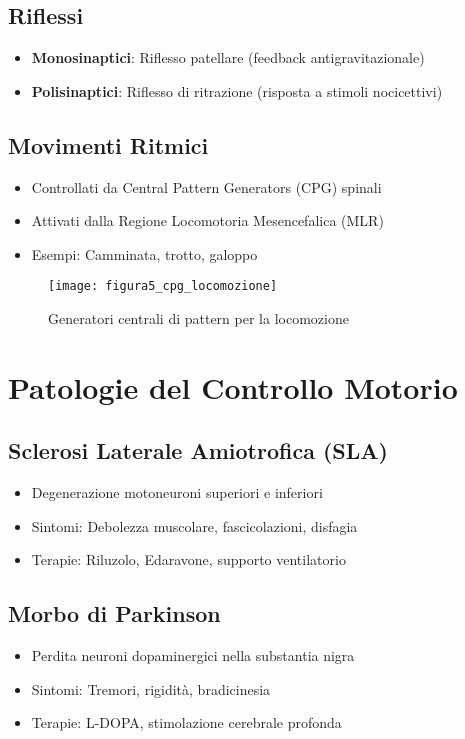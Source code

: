 \documentclass{article}
\begin{document}
\subsection{Riflessi}
\begin{itemize}
    \item \textbf{Monosinaptici}: Riflesso patellare (feedback antigravitazionale)
    \item \textbf{Polisinaptici}: Riflesso di ritrazione (risposta a stimoli nocicettivi)
\end{itemize}

\subsection{Movimenti Ritmici}
\begin{itemize}
    \item Controllati da Central Pattern Generators (CPG) spinali
    \item Attivati dalla Regione Locomotoria Mesencefalica (MLR)
    \item Esempi: Camminata, trotto, galoppo
\end{itemize}

\begin{figure}[h]
    \centering
    \texttt{[image: figura5\_cpg\_locomozione]}
    \caption{Generatori centrali di pattern per la locomozione}
    \label{fig:cpg_locomozione}
\end{figure}

\section{Patologie del Controllo Motorio}
\subsection{Sclerosi Laterale Amiotrofica (SLA)}
\begin{itemize}
    \item Degenerazione motoneuroni superiori e inferiori
    \item Sintomi: Debolezza muscolare, fascicolazioni, disfagia
    \item Terapie: Riluzolo, Edaravone, supporto ventilatorio
\end{itemize}

\subsection{Morbo di Parkinson}
\begin{itemize}
    \item Perdita neuroni dopaminergici nella substantia nigra
    \item Sintomi: Tremori, rigidità, bradicinesia
    \item Terapie: L-DOPA, stimolazione cerebrale profonda
\end{itemize}
\end{document}
